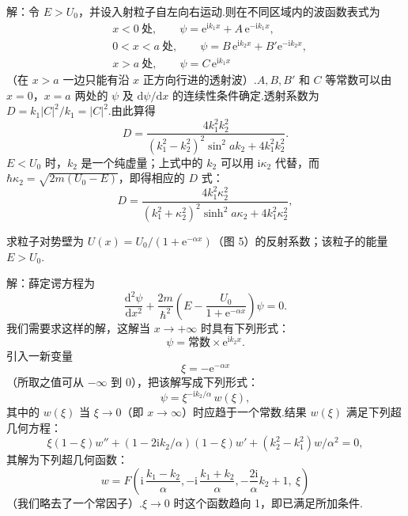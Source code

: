 \begin{xiti}
解：令 $E>U_0$，并设入射粒子自左向右运动.则在不同区域内的波函数表式为
\begin{equation*}
\begin{aligned}
  &x<0\ \text{处},\qquad
  \psi=\mathrm{e}^{\mathrm{i}k_1x}+A\,\mathrm{e}^{-\mathrm{i}k_1x},\\
  &0<x<a\ \text{处},\qquad
  \psi=B\,\mathrm{e}^{\mathrm{i}k_2x}+B'\mathrm{e}^{-\mathrm{i}k_2x},\\
  &x>a\ \text{处},\qquad
  \psi=C\,\mathrm{e}^{\mathrm{i}k_1x}
\end{aligned}
\end{equation*}
（在 $x>a$ 一边只能有沿 $x$ 正方向行进的透射波）.$A,B,B'$ 和 $C$ 等常数可以由 $x=0$，$x=a$ 两处的 $\psi$ 及 $\mathrm{d}\psi/\mathrm{d}x$ 的连续性条件确定.透射系数为
$D=k_1|C|^2/k_1=|C|^2$.由此算得
\begin{equation*}
  D=\frac{4k_1^2 k_2^2}
  {\left(k_1^2-k_2^2\right)^2\sin^2 ak_2+4k_1^2 k_2^2}.
\end{equation*}
$E<U_0$ 时，$k_2$ 是一个纯虚量；上式中的 $k_2$ 可以用 $\mathrm{i}\kappa_2$ 代替，而
$\hbar\kappa_2=\sqrt{2m\left(U_0-E\right)}$，即得相应的 $D$ 式：
\begin{equation*}
  D=\frac{4k_1^2\kappa_2^2}
  {\left(k_1^2+\kappa_2^2\right)^2\sinh^2 a\kappa_2+4k_1^2\kappa_2^2},
\end{equation*}

\quad 求粒子对势壁为
$U(x)=U_0/\left(1+\mathrm{e}^{-\alpha x}\right)$（图 5）的反射系数；该粒子的能量 $E>U_0$.

解：薛定谔方程为
\begin{equation*}
  \frac{\mathrm{d}^2\psi}{\mathrm{d}x^2}
  +\frac{2m}{\hbar^2}
  \left(E-\frac{U_0}{1+\mathrm{e}^{-\alpha x}}\right)\psi=0.
\end{equation*}
我们需要求这样的解，这解当 $x\to+\infty$ 时具有下列形式：
\begin{equation*}
  \psi=\text{常数}\times\mathrm{e}^{\mathrm{i}k_2 x}.
\end{equation*}
引入一新变量
\begin{equation*}
  \xi=-\mathrm{e}^{-\alpha x}
\end{equation*}
（所取之值可从 $-\infty$ 到 0），把该解写成下列形式：
\begin{equation*}
  \psi=\xi^{-\mathrm{i}k_2/\alpha}\,w(\xi),
\end{equation*}
其中的 $w(\xi)$ 当 $\xi\to 0$（即 $x\to\infty$）时应趋于一个常数.结果 $w(\xi)$ 满足下列超几何方程：
\begin{equation*}
  \xi\left(1-\xi\right)w''
  +\left(1-2\mathrm{i}k_2/\alpha\right)\left(1-\xi\right)w'
  +\left(k_2^2-k_1^2\right)w/\alpha^2=0,
\end{equation*}
其解为下列超几何函数：
\begin{equation*}
  w=F\left(\mathrm{i}\,\frac{k_1-k_2}{\alpha},
  -\mathrm{i}\,\frac{k_1+k_2}{\alpha},
  -\frac{2\mathrm{i}}{\alpha}k_2+1,\ \xi\right)
\end{equation*}
（我们略去了一个常因子）.$\xi\to 0$ 时这个函数趋向 1，即已满足所加条件.


\end{xiti}
